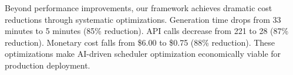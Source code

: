 Beyond performance improvements, our framework achieves dramatic cost reductions through systematic optimizations. Generation time drops from 33 minutes to 5 minutes (85\% reduction). API calls decrease from 221 to 28 (87\% reduction). Monetary cost falls from \$6.00 to \$0.75 (88\% reduction). These optimizations make AI-driven scheduler optimization economically viable for production deployment.

